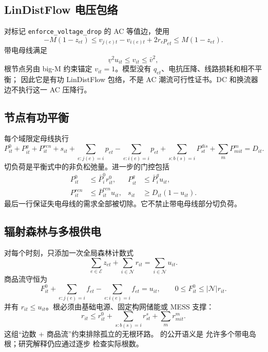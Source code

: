 \subsection{LinDistFlow 电压包络}

对标记 \texttt{enforce\_voltage\_drop} 的 AC 等值边，使用
\begin{equation}
 -M(1-z_{et})\le
 v_{j(e)t}-v_{i(e)t}+2r_ep_{et}
 \le M(1-z_{et}).
\end{equation}
带电母线满足
\begin{equation}
 \underline v^2u_{it}\le v_{it}\le\bar v^2,
\end{equation}
根节点另由 big-M 约束锚定 $v_{it}=1$。模型没有 $q_{et}$、电抗压降、线路损耗和相不平衡；
因此它是有功 LinDistFlow 包络，不是 AC 潮流可行性证书。DC 和换流器边不执行这一 AC 压降行。

\subsection{节点有功平衡}

每个域限定母线执行
\begin{equation}
 P^0_{it}+P^g_{it}+P^{ren}_{it}+s_{it}
 +\sum_{e:j(e)=i}p_{et}-\sum_{e:i(e)=i}p_{et}
 +\sum_{s:b(s)=i}P^{dis}_{st}+\sum_mP^m_{mit}=D_{it}.
\end{equation}
切负荷是平衡式中的非负松弛量。进一步的门控包括
\begin{align}
 P^0_{it}&\le\bar P^0_i r^0_{it},&
 P^g_{it}&\le\bar P^g_i u_{it},\\
 P^{ren}_{it}&\le\bar P^{ren}_{it}u_{it},&
 s_{it}&\ge D_{it}(1-u_{it}).
\end{align}
最后一行保证失电母线的需求全部被切除。它不禁止带电母线部分切负荷。

\subsection{辐射森林与多根供电}

对每个时刻，只添加一次全局森林计数式
\begin{equation}
 \sum_{e\in\mathcal E}z_{et}+\sum_{i\in\mathcal N}r_{it}
 =\sum_{i\in\mathcal N}u_{it}.
\end{equation}
商品流守恒为
\begin{equation}
 F^0_{it}+\sum_{e:j(e)=i}f_{et}-\sum_{e:i(e)=i}f_{et}=u_{it},
 \qquad 0\le F^0_{it}\le|\mathcal N|r_{it}.
\end{equation}
并有 $r_{it}\le u_{it}$。根必须由基础电源、固定构网储能或 MESS 支撑：
\begin{equation}
 r_{it}\le r^0_{it}+\sum_{s:b(s)=i}r^s_{st}+\sum_m r^m_{mit}.
\end{equation}
这组“边数 + 商品流”约束排除孤立的无根环路。 的公开语义是
允许多个带电岛根；研究解释仍应通过逐步  检查实际根数。


